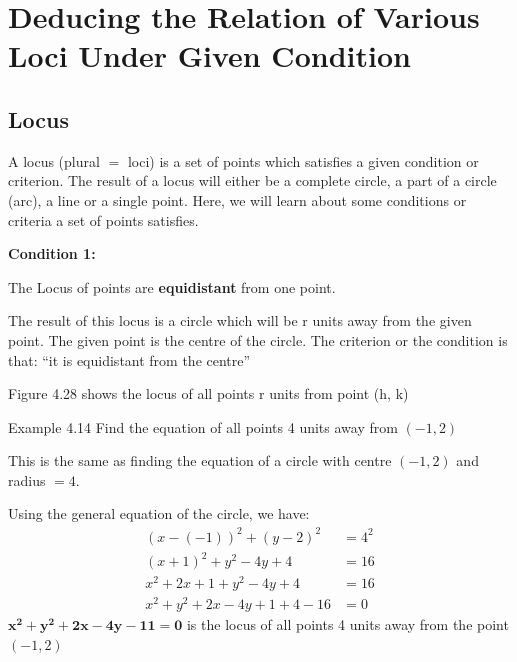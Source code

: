 \section{Deducing the Relation of Various Loci Under Given Condition}

\subsection{Locus}

A locus (plural $=$ loci) is a set of points which satisfies a given condition or
criterion. The result of a locus will either be a complete circle, a part of a circle
(arc), a line or a single point. Here, we will learn about some conditions or criteria
a set of points satisfies.

\textbf{Condition 1:}

The Locus of points are \textbf{equidistant} from one point.

The result of this locus is a circle which will be r units away from the given point.
The given point is the centre of the circle. The criterion or the condition is that:
``it is equidistant from the centre''

Figure 4.28 shows the locus of all points r units from point (h, k)
\begin{center}
\end{center}

\begin{example}{Example 4.14}
Find the equation of all points 4 units away from $(-1, 2)$

\solution
This is the same as finding the equation of a circle with centre $(-1, 2)$ and radius
$= 4$.

Using the general equation of the circle, we have:
\begin{align*}
(x - (-1))^2 + (y - 2)^2 &= 4^2 \\
(x + 1)^2 + y^2 - 4y + 4 &= 16 \\
x^2 + 2x + 1 + y^2 - 4y + 4 &= 16 \\
x^2 + y^2 + 2x - 4y + 1 + 4 - 16 &= 0
\end{align*}
$\boldsymbol{x^2 + y^2 + 2x - 4y - 11 = 0}$ is the locus of all points 4 units away from the point
$(-1, 2)$
\end{example}

